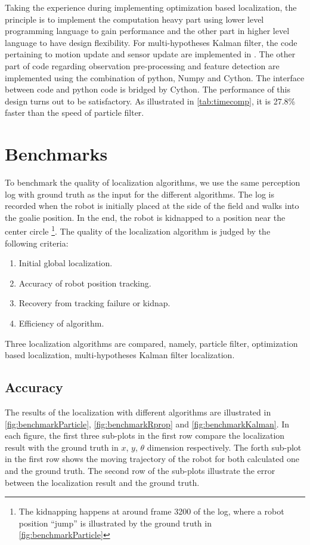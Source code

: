 Taking the experience during implementing optimization based localization, the principle is to implement the computation heavy part using lower level programming language to gain performance and the other part in higher level language to have design flexibility.
For multi-hypotheses Kalman filter, the code pertaining to motion update and sensor update are implemented in \cpp. The other part of code regarding observation pre-processing and feature detection are implemented using the combination of python, Numpy and Cython. The interface between \cpp  code and python code is bridged by Cython. The performance of this design turns out to be satisfactory. As illustrated in \autoref{tab:timecomp}, it is 27.8\% faster than the speed of particle filter.

\section{Benchmarks}
\label{sec:Benchmark}
To benchmark the quality of localization algorithms, we use the same perception log with ground truth as the input for the different algorithms. The log is recorded when the robot is initially placed at the side of the field and walks into the goalie position. In the end, the robot is kidnapped to a position near the center circle \footnote{The kidnapping happens at around frame 3200 of the log, where a robot position ``jump'' is illustrated by the ground truth in \autoref{fig:benchmarkParticle}}. The quality of the localization algorithm is judged by the following criteria: 
\begin{enumerate}
  \item Initial global localization.
  \item Accuracy of robot position tracking.
  \item Recovery from tracking failure or kidnap.
  \item Efficiency of algorithm.
\end{enumerate}

Three localization algorithms are compared, namely, particle filter, optimization based localization, multi-hypotheses Kalman filter localization.

\subsection{Accuracy}
\label{sub:Accuracy}
The results of the localization with different algorithms are illustrated in 
\autoref{fig:benchmarkParticle}, \autoref{fig:benchmarkRprop} and \autoref{fig:benchmarkKalman}. In each figure, the first three sub-plots in the first row compare the localization result with the ground truth in $x$, $y$, $\theta$ dimension respectively. The forth sub-plot in the first row shows the moving trajectory of the robot for both calculated one and the ground truth. The second row of the sub-plots illustrate the error between the localization result and the ground truth.

